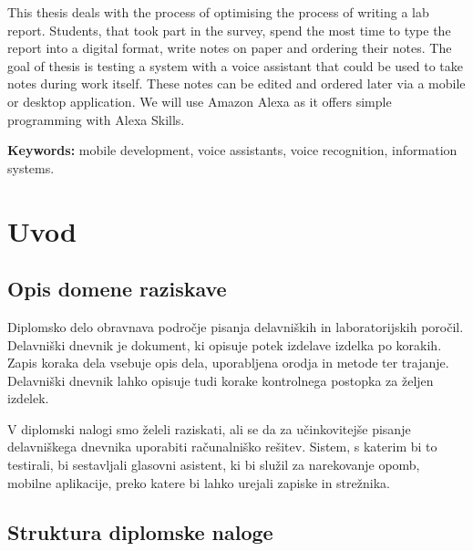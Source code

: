 \documentclass[a4paper, 12pt]{book}
\newcommand{\tkeywordsEn}{mobile development, voice assistants, voice recognition, information systems}
\newcommand{\clearemptydoublepage}{\newpage{\pagestyle{empty}\cleardoublepage}}
\begin{document}
\noindent This thesis deals with the process of optimising the process of writing a lab report.
Students, that took part in the survey, spend the most time to type the report into a digital format, write notes on paper and ordering their notes.
The goal of thesis is testing a system with a voice assistant that could be used to take notes during work itself.
These notes can be edited and ordered later via a mobile or desktop application.
We will use Amazon Alexa as it offers simple programming with Alexa Skills.
\bigskip

\noindent\textbf{Keywords:} \tkeywordsEn.
\clearemptydoublepage

\mainmatter
\setcounter{page}{1}
\pagestyle{fancy}

\chapter{Uvod}
\section{Opis domene raziskave}

Diplomsko delo obravnava področje pisanja delavniških in laboratorijskih poročil.
Delavniški dnevnik je dokument, ki opisuje potek izdelave izdelka po korakih.
Zapis koraka dela vsebuje opis dela, uporabljena orodja in metode ter trajanje.
Delavniški dnevnik lahko opisuje tudi korake kontrolnega postopka za željen izdelek.

V diplomski nalogi smo želeli raziskati, ali se da za učinkovitejše pisanje delavniškega dnevnika uporabiti računalniško rešitev.
Sistem, s katerim bi to testirali, bi sestavljali glasovni asistent, ki bi služil za narekovanje opomb, mobilne aplikacije, preko katere bi lahko urejali zapiske in strežnika.

\section{Struktura diplomske naloge}
\end{document}
